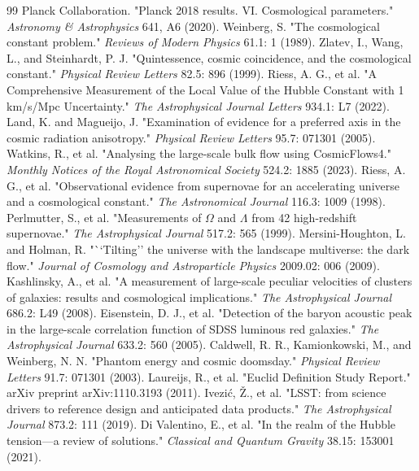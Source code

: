 \documentclass{article}
\begin{document}
\begin{thebibliography}{99}
 Planck Collaboration. "Planck 2018 results. VI. Cosmological parameters." \textit{Astronomy \& Astrophysics} 641, A6 (2020).
 Weinberg, S. "The cosmological constant problem." \textit{Reviews of Modern Physics} 61.1: 1 (1989).
 Zlatev, I., Wang, L., and Steinhardt, P. J. "Quintessence, cosmic coincidence, and the cosmological constant." \textit{Physical Review Letters} 82.5: 896 (1999).
 Riess, A. G., et al. "A Comprehensive Measurement of the Local Value of the Hubble Constant with 1 km/s/Mpc Uncertainty." \textit{The Astrophysical Journal Letters} 934.1: L7 (2022).
 Land, K. and Magueijo, J. "Examination of evidence for a preferred axis in the cosmic radiation anisotropy." \textit{Physical Review Letters} 95.7: 071301 (2005).
 Watkins, R., et al. "Analysing the large-scale bulk flow using CosmicFlows4." \textit{Monthly Notices of the Royal Astronomical Society} 524.2: 1885 (2023).
 Riess, A. G., et al. "Observational evidence from supernovae for an accelerating universe and a cosmological constant." \textit{The Astronomical Journal} 116.3: 1009 (1998).
 Perlmutter, S., et al. "Measurements of $\Omega$ and $\Lambda$ from 42 high-redshift supernovae." \textit{The Astrophysical Journal} 517.2: 565 (1999).
 Mersini-Houghton, L. and Holman, R. "``Tilting'' the universe with the landscape multiverse: the dark flow." \textit{Journal of Cosmology and Astroparticle Physics} 2009.02: 006 (2009).
 Kashlinsky, A., et al. "A measurement of large-scale peculiar velocities of clusters of galaxies: results and cosmological implications." \textit{The Astrophysical Journal} 686.2: L49 (2008).
 Eisenstein, D. J., et al. "Detection of the baryon acoustic peak in the large-scale correlation function of SDSS luminous red galaxies." \textit{The Astrophysical Journal} 633.2: 560 (2005).
 Caldwell, R. R., Kamionkowski, M., and Weinberg, N. N. "Phantom energy and cosmic doomsday." \textit{Physical Review Letters} 91.7: 071301 (2003).
 Laureijs, R., et al. "Euclid Definition Study Report." arXiv preprint arXiv:1110.3193 (2011).
 Ivezić, Ž., et al. "LSST: from science drivers to reference design and anticipated data products." \textit{The Astrophysical Journal} 873.2: 111 (2019).
 Di Valentino, E., et al. "In the realm of the Hubble tension—a review of solutions." \textit{Classical and Quantum Gravity} 38.15: 153001 (2021).

\end{thebibliography}
\end{document}
